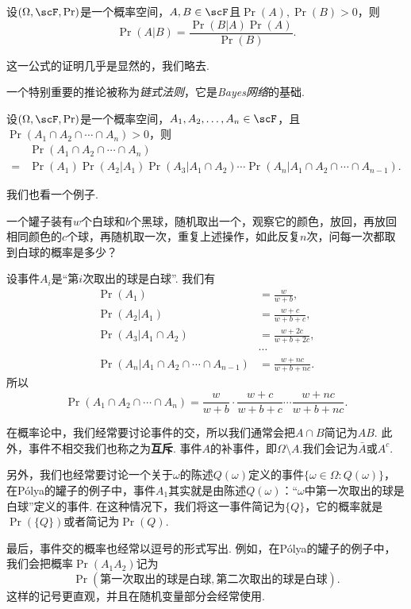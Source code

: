 \begin{theorem}[贝叶斯公式]\label{thm:bayes}
设$(\Omega,\scF,\Pr)$是一个概率空间，$A,B\in\scF$且$\Pr(A),\Pr(B)>0$，则
\[
    \Pr(A|B) = \frac{\Pr(B|A)\Pr(A)}{\Pr(B)}.
\]
\end{theorem}

这一公式的证明几乎是显然的，我们略去. 

一个特别重要的推论被称为\emph{链式法则}，它是\emph{Bayes网络}的基础. 

\begin{corollary}[链式法则]\label{cor:chain-rule}
设$(\Omega,\scF,\Pr)$是一个概率空间，$A_1,A_2,\ldots,A_n\in\scF$，且$\Pr(A_1\cap A_2\cap\cdots\cap A_n)>0$，则
\begin{align*}
    &\Pr(A_1\cap A_2\cap\cdots\cap A_n)\\
    = &\Pr(A_1)\Pr(A_2|A_1)\Pr(A_3|A_1\cap A_2)\cdots\Pr(A_n|A_1\cap A_2\cap\cdots\cap A_{n-1}).
\end{align*}
\end{corollary}

我们也看一个例子. 

\begin{example}[P\'olya的罐子]
    一个罐子装有$w$个白球和$b$个黑球，随机取出一个，观察它的颜色，放回，再放回相同颜色的$c$个球，再随机取一次，重复上述操作，如此反复$n$次，问每一次都取到白球的概率是多少？

    设事件$A_i$是“第$i$次取出的球是白球”. 我们有
\begin{align*}
    \Pr(A_1)&=\frac{w}{w+b},\\
    \Pr(A_2|A_1)&=\frac{w+c}{w+b+c},\\
    \Pr(A_3|A_1\cap A_2)&=\frac{w+2c}{w+b+2c},\\
    &\cdots\\
    \Pr(A_n|A_1\cap A_2\cap\cdots\cap A_{n-1})&=\frac{w+nc}{w+b+nc}.
\end{align*}
    所以
\[
    \Pr(A_1\cap A_2\cap\cdots\cap A_n) = \frac{w}{w+b}\cdot\frac{w+c}{w+b+c}\cdots\frac{w+nc}{w+b+nc}.
\]
\end{example}

\begin{remark}
    在概率论中，我们经常要讨论事件的交，所以我们通常会把$A\cap B$简记为$AB$. 此外，事件不相交我们也称之为\textbf{互斥}. 事件$A$的补事件，即$\Omega\setminus A$.我们会记为$\bar{A}$或$A^c$.
    
    另外，我们也经常要讨论一个关于$\omega$的陈述$Q(\omega)$定义的事件$\{\omega\in\Omega:Q(\omega)\}$，在P\'olya的罐子的例子中，事件$A_1$其实就是由陈述$Q(\omega)$：“$\omega$中第一次取出的球是白球”定义的事件. 在这种情况下，我们将这一事件简记为$\{Q\}$，它的概率就是$\Pr(\{Q\})$或者简记为$\Pr(Q)$. 
    
    最后，事件交的概率也经常以逗号的形式写出. 例如，在P\'olya的罐子的例子中，我们会把概率$\Pr(A_1A_2)$记为
    \[\Pr(\text{第一次取出的球是白球},\text{第二次取出的球是白球}).\] 
    这样的记号更直观，并且在随机变量部分会经常使用. 
\end{remark}

